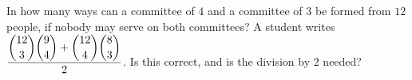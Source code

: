 In how many ways can a committee of $4$ and a committee of $3$ be formed from $12$ people, if nobody may serve on both committees? A student writes $\dfrac{\dbinom{12}{3}\dbinom94+\dbinom{12}4\dbinom83}{2}$. Is this correct, and is the division by $2$ needed?
